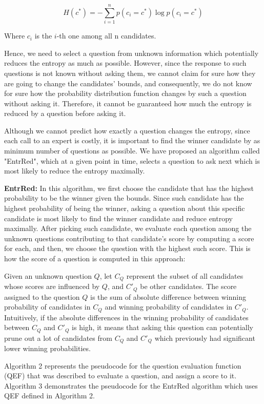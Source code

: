 \[
H(c^*) = - \sum_{i=1}^{n} p(c_i = c^*) \log p(c_i = c^*)
\]

Where $c_i$ is the $i$-th one among all n candidates.  

Hence, we need to select a question from unknown information which potentially reduces the entropy as much as possible. However, since the response to such questions is not known without asking them, we cannot claim for sure how they are going to change the candidates' bounds, and consequently, we do not know for sure how the probability distribution function changes by such a question without asking it. Therefore, it cannot be guaranteed how much the entropy is reduced by a question before asking it. 

Although we cannot predict how exactly a question changes the entropy, since each call to an expert is costly, it is important to find the winner candidate by as minimum number of questions as possible. We have proposed an algorithm called "EntrRed", which at a given point in time, selects a question to ask next which is most likely to reduce the entropy maximally. 

\textbf{EntrRed:} In this algorithm, we first choose the candidate that has the highest probability to be the winner given the bounds. Since such candidate has the highest probability of being the winner, asking a question about this specific candidate is most likely to find the winner candidate and reduce entropy maximally. After picking such candidate, we evaluate each question among the unknown questions contributing to that candidate's score by computing a score for each, and then, we choose the question with the highest such score. This is how the score of a question is computed in this approach:

Given an unknown question $Q$, let $C_Q$ represent the subset of all candidates whose scores are influenced by $Q$, and $C'_Q$ be other candidates. The score assigned to the question $Q$ is the sum of absolute difference between winning probability of candidates in $C_Q$ and winning probability of candidates in $C'_Q$. Intuitively, if the absolute differences in the winning probability of candidates between $C_Q$ and $C'_Q$ is high, it means that asking this question can potentially prune out a lot of candidates from $C_Q$ and $C'_Q$ which previously had significant lower winning probabilities.

Algorithm 2 represents the pseudocode for the question evaluation function (QEF) that was described to evaluate a question, and assign a score to it. Algorithm 3 demonstrates the pseudocode for the EntrRed algorithm which uses QEF defined in Algorithm 2. 

